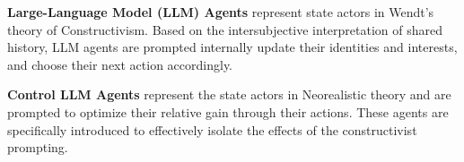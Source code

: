 %

\textbf{Large-Language Model (LLM) Agents} represent state actors in Wendt's theory of Constructivism. Based on the intersubjective interpretation of shared history, LLM agents are prompted internally update their identities and interests, and choose their next action accordingly.

%

\textbf{Control LLM Agents} represent the state actors in Neorealistic theory and are prompted to optimize their relative gain through their actions. These agents are specifically introduced to effectively isolate the effects of the constructivist prompting.

%

